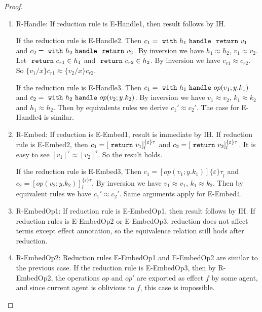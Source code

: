 \begin{theorem}
\begin{proof}
\begin{enumerate}
\item R-Handle: If reduction rule is E-Handle1, then result follows by IH. 

If the reduction rule is E-Handle2. Then $c_1 = \ \texttt{with}\  h_1 \ \texttt{handle}\  \ \texttt{return}\  v_1$ and $c_2 = \ \texttt{with}\  h_2 \ \texttt{handle}\  \ \texttt{return}\  v_2$. By inversion we have $h_1 \approx h_2$, $v_1 \approx v_2$.  Let $\ \texttt{return}\  c_{r1} \in h_1$ and $\ \texttt{return}\  c_{r2} \in h_2$. By inversion we have $c_{r1} \approx c_{r2}$. So $\{v_1/x\}c_{r1} \approx \{v_2/x\}c_{r2}$.

If the reduction rule is E-Handle3. Then $c_1 = \ \texttt{with}\  h_1 \ \texttt{handle}\  op(v_1; y. k_1)$ and $c_2 = \ \texttt{with}\  h_2 \ \texttt{handle}\  op(v_2; y.k_2) $. By inversion we have $v_1 \approx v_2$, $k_1 \approx k_2$ and $h_1 \approx h_2$. Then by equivalents rules we derive $c_1' \approx c_2'$. The case for E-Handle4 is similar.

\item R-Embed: If reduction is E-Embed1,  result is immediate by IH. If reduction rule is E-Embed2, then $c_1 = [\ \texttt{return}\  v_1]^{\{\varepsilon\}\tau}_l$ and $c_2 = [\ \texttt{return}\  v_2]^{\{\varepsilon\}\tau}_l$. It is easy to see $[v_1]^\tau \approx [v_2]^\tau$. So the result holds.

If the reduction rule is E-Embed3, Then $c_1 = [op(v_1; y. k_1)]{\{\varepsilon\}\tau}_l$ and $c_2 = [op(v_2; y. k_2)]^{\{\varepsilon\}\tau}_l$. By inversion we have $v_1 \approx v_1$, $k_1 \approx k_2$. Then by equivalent rules we have $c_1' \approx c_2'$. Same arguments apply for E-Embed4.

\item R-EmbedOp1: If reduction rule is E-EmbedOp1, then result follows by IH. If reduction rules is E-EmbedOp2 or E-EmbedOp3, reduction does not affect terms except effect annotation, so the equivalence relation still hods after reduction.

\item R-EmbedOp2: Reduction rules E-EmbedOp1 and E-EmbedOp2 are similar to the previous case. If the reduction rule is E-EmbedOp3, then by R-EmbedOp2, the operations $op$ and $op'$ are exported as effect $f$ by some agent, and since current agent is oblivious to $f$, this case is impossible.

\end{enumerate}


\end{proof}


\end{theorem}

\pagebreak
